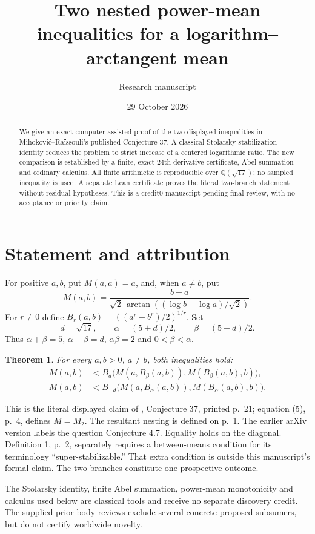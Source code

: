 \documentclass[11pt]{article}
\title{Two nested power-mean inequalities for a logarithm--arctangent mean}
\author{Research manuscript}
\date{29 October 2026}
\newtheorem{theorem}{Theorem}
\newcommand{\atan}{\operatorname{arctan}}
\begin{document}
\maketitle
\begin{abstract}
We give an exact computer-assisted proof of the two displayed inequalities in Mihokovi\'c--Ra\"issouli's published Conjecture 37. A classical Stolarsky stabilization identity reduces the problem to strict increase of a centered logarithmic ratio. The new comparison is established by a finite, exact 24th-derivative certificate, Abel summation and ordinary calculus. All finite arithmetic is reproducible over $\mathbb Q(\sqrt {17})$; no sampled inequality is used. A separate Lean certificate proves the literal two-branch statement without residual hypotheses. This is a credit0 manuscript pending final review, with no acceptance or priority claim.
\end{abstract}
\section{Statement and attribution}
For positive $a,b$, put $M(a,a)=a$, and, when $a\ne b$, put
\[
 M(a,b)=\frac{b-a}{\sqrt2\,\atan((\log b-\log a)/\sqrt2)}.
\]
For $r\ne0$ define $B_r(a,b)=((a^r+b^r)/2)^{1/r}$. Set
\[
 d=\sqrt {17},\qquad \alpha=(5+d)/2,\qquad \beta=(5-d)/2.
\]
Thus $\alpha+\beta=5$, $\alpha-\beta=d$, $\alpha\beta=2$ and $0<\beta<\alpha$.
\begin{theorem}\label{main}
For every $a,b>0$, $a\ne b$, both inequalities hold:
\begin{align*}
M(a,b)&<B_d\bigl(M(a,B_\beta(a,b)),M(B_\beta(a,b),b)\bigr),\\
M(a,b)&<B_{-d}\bigl(M(a,B_\alpha(a,b)),M(B_\alpha(a,b),b)\bigr).
\end{align*}
\end{theorem}
This is the literal displayed claim of \cite{MR}, Conjecture 37, printed p.~21; equation (5), p.~4, defines $M=M_2$. The resultant nesting is defined on p.~1. The earlier arXiv version labels the question Conjecture 4.7. Equality holds on the diagonal. Definition 1, p.~2, separately requires a between-means condition for its terminology ``super-stabilizable.'' That extra condition is outside this manuscript's formal claim. The two branches constitute one prospective outcome.

The Stolarsky identity, finite Abel summation, power-mean monotonicity and calculus used below are classical tools and receive no separate discovery credit. The supplied prior-body reviews exclude several concrete proposed subsumers, but do not certify worldwide novelty.
\newpage
\end{document}
